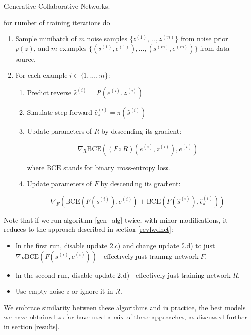 \documentclass[conference]{IEEEtran}
\begin{document}
\begin{algorithm}
    \label{gcn_alg}
    \caption{Generative Collaborative Networks.}
    for number of training iterations do
    \begin{enumerate}
    \item Sample minibatch of $m$ noise samples $\{z^{(1)}
    , . . . , z^{(m)}\}$ from noise prior $p(z)$, and $m$ examples $\{(s^{(1)}, e
    ^{(1)}), . . . , (s^{(m)}, e^{(m)})\}$ from data source.
    \item For each example $i\in\{1,...,m\}$:
    \begin{enumerate}
        \item Predict reverse $\hat s^{(i)} = R(e^{(i)}, z^{(i)})$
        \item Simulate step forward $\hat e_\pi^{(i)} = \pi(\hat s^{(i)})$
        \item Update parameters of $R$ by descending its gradient:
        
        $$\nabla_R \text{BCE}((F \circ R) (e^{(i)}, z^{(i)}), e^{(i)}) $$
        
        where $\text{BCE}$ stands for binary cross-entropy loss.
        
        \item Update parameters of $F$ by descending its gradient:
        
        $$\nabla_F \left(\text{BCE}(F(s^{(i)}), e^{(i)}) + \text{BCE}(F(\hat s^{(i)}), \hat e_{\pi}^{(i)})\right)$$
    \end{enumerate}
    \end{enumerate}
\end{algorithm} 

Note that if we run algorithm \ref{gcn_alg} twice, with minor modifications, it reduces to the approach described in section \ref{revfwdnet}:
\begin{itemize}
    \item In the first run, disable update 2.c) and change update 2.d) to just $\nabla_F \text{BCE}(F(s^{(i)}, e^{(i)}))$ - effectively just training network $F$.
    \item In the second run, disable update 2.d) - effectively just training network $R$.
    \item Use empty noise $z$ or ignore it in $R$.
\end{itemize}

We embrace similarity between these algorithms and in practice, the best models we have obtained so far have used a mix of these approaches, as discussed further in section \ref{results}.
\end{document}
